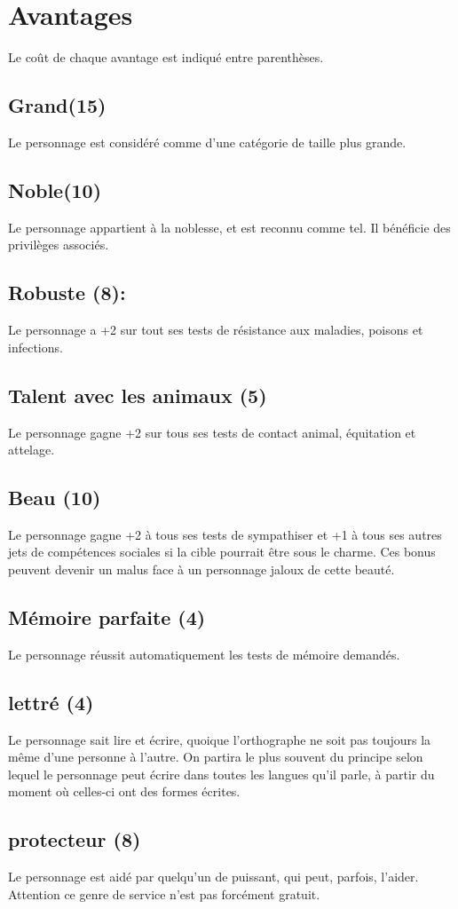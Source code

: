 \documentclass[10pt,a4paper,twocolumn]{book}
\begin{document}
\section{Avantages}
Le coût de chaque avantage est indiqué entre parenthèses.
\subsection*{Grand(15)}
Le personnage est considéré comme d’une catégorie de taille plus grande.
\subsection*{Noble(10) }
Le personnage appartient à la noblesse, et est reconnu comme tel. Il bénéficie des privilèges associés.
\subsection*{Robuste (8):}
Le personnage a +2 sur tout ses tests de résistance aux maladies, poisons et infections.
\subsection*{Talent avec les animaux (5)}
Le personnage gagne +2 sur tous ses tests de contact animal, équitation et attelage.
\subsection*{Beau (10)}
Le personnage gagne +2 à tous ses tests de sympathiser et +1 à tous ses autres jets de compétences sociales si la cible pourrait être sous le charme. Ces bonus peuvent devenir un malus face à un personnage jaloux de cette beauté.
\subsection*{Mémoire parfaite (4) }
Le personnage réussit automatiquement les tests de mémoire demandés.
\subsection*{lettré (4) } 
Le personnage sait lire et écrire, quoique l'orthographe ne soit pas toujours la même d'une personne à l'autre. On partira le plus souvent du principe selon lequel le personnage peut écrire dans toutes les langues qu'il parle, à partir du moment où celles-ci ont des formes écrites.
\subsection*{protecteur (8) }
Le personnage est aidé par quelqu'un de puissant, qui peut, parfois, l'aider. Attention ce genre de service n'est pas forcément gratuit.
\end{document}
